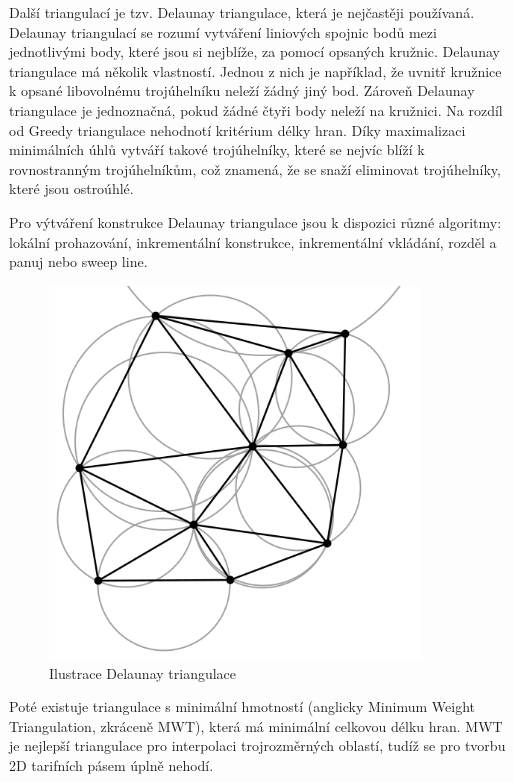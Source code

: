 Další triangulací je tzv. Delaunay triangulace, která je nejčastěji používaná.
Delaunay triangulací se rozumí vytváření liniových spojnic bodů mezi jednotlivými body, které jsou si nejblíže,
za pomocí opsaných kružnic. Delaunay triangulace má několik vlastností. Jednou z nich je například,
že uvnitř kružnice k opsané libovolnému trojúhelníku neleží žádný jiný bod.
Zároveň Delaunay triangulace je jednoznačná, pokud žádné čtyři body neleží na kružnici.
Na rozdíl od Greedy triangulace nehodnotí kritérium délky hran. Díky maximalizaci minimálních
úhlů vytváří takové trojúhelníky, které se nejvíc blíží k rovnostranným trojúhelníkům, 
což znamená, že se snaží eliminovat trojúhelníky, které jsou ostroúhlé.

Pro výtváření konstrukce Delaunay triangulace jsou k dispozici různé algoritmy: lokální prohazování, 
inkrementální konstrukce, inkrementální vkládání, rozděl a panuj nebo sweep line. \cite{bayer-delaunay}

\begin{figure}[H] \centering
    \includegraphics[width=280pt]{./pictures/triangulace-delaunay.png}
    \caption[Ilustrace Delaunay triangulace]{Ilustrace Delaunay triangulace \cite{triangulace-delaunay}}
	\label{fig:triangulace-delaunay}              
\end{figure}

Poté existuje triangulace s minimální hmotností (anglicky Minimum Weight Triangulation, zkráceně MWT),
která má minimální celkovou délku hran. MWT je nejlepší triangulace pro interpolaci trojrozměrných oblastí,
tudíž se pro tvorbu 2D tarifních pásem úplně nehodí.

